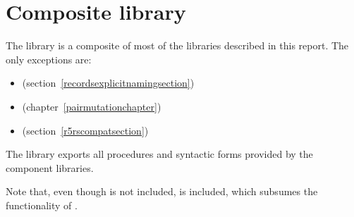 \chapter{Composite library}
\label{complibchapter}

The  library is a composite of most of the libraries
described in this report.  The only exceptions are:
%
\begin{itemize}
\item {} (section~\ref{recordsexplicitnamingsection})
\item {} (chapter~\ref{pairmutationchapter})
\item {} (section~\ref{r5rscompatsection})
\end{itemize}
%
The library exports all procedures and syntactic forms provided by the
component libraries.

\begin{note}
  Note that, even though  is not
  included,  is included, which
  subsumes the functionality of .
\end{note}
